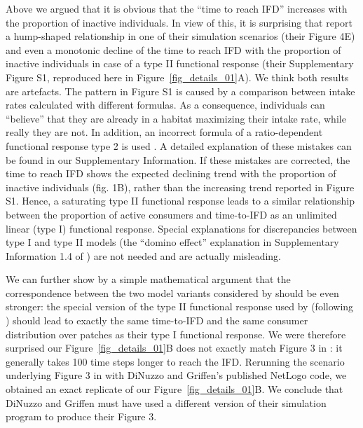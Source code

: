 \begin{interludeenv}
	Above we argued that it is obvious that the ``time to reach IFD'' increases with the proportion of inactive individuals.
	In view of this, it is surprising that \citeauthor{dinuzzo2020} report a hump-shaped relationship in one of their simulation scenarios (their Figure 4E) and even a monotonic decline of the time to reach IFD with the proportion of inactive individuals in case of a type II functional response (their Supplementary Figure S1, reproduced here in Figure~\ref{fig_details_01}A).
	We think both results are artefacts.
	The pattern in Figure S1 is caused by a comparison between intake rates calculated with different formulas.
	As a consequence, individuals can “believe” that they are already in a habitat maximizing their intake rate, while really they are not.
	In addition, an incorrect formula of a ratio-dependent functional response type 2 is used \parencite[following][]{abrams2000} .
	A detailed explanation of these mistakes can be found in our Supplementary Information.
	If these mistakes are corrected, the time to reach IFD shows the expected declining trend with the proportion of inactive individuals (fig. 1B), rather than the increasing trend reported in Figure S1.
	Hence, a saturating type II functional response leads to a similar relationship between the proportion of active consumers and time-to-IFD as an unlimited linear (type I) functional response.
	Special explanations for discrepancies between type I and type II models (the ``domino effect'' explanation in Supplementary Information 1.4 of \cite{dinuzzo2020}) are not needed and are actually misleading.
	
	We can further show by a simple mathematical argument that the correspondence between the two model variants considered by \citeauthor{dinuzzo2020} should be even stronger: the special version of the type II functional response used by \citeauthor{dinuzzo2020} (following \cite{abrams2000}) should lead to exactly the same time-to-IFD and the same consumer distribution over patches as their type I functional response.
	We were therefore surprised our Figure~\ref{fig_details_01}B does not exactly match Figure 3 in \parencite{dinuzzo2020}: it generally takes 100 time steps longer to reach the IFD.
	Rerunning the scenario underlying Figure 3 in \parencite{dinuzzo2020} with DiNuzzo and Griffen's published NetLogo code, we obtained an exact replicate of our Figure~\ref{fig_details_01}B.
	We conclude that DiNuzzo and Griffen must have used a different version of their simulation program to produce their Figure 3.


\end{interludeenv}
